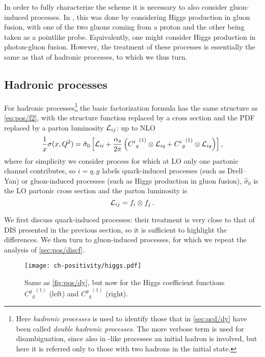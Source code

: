 In order to fully characterize the scheme it is necessary to also consider
gluon-induced processes. 
In \cite{Altarelli:1998gn}, this was done by considering Higgs production in
gluon fusion, with one of the two gluons coming from a proton and the other
being taken as a pointlike probe.
Equivalently, one might consider Higgs production in photon-gluon fusion.
However, the treatment of these processes is essentially the same as that of
hadronic processes, to which we thus turn.


\subsection{Hadronic processes}
\label{sec:pos/hadr}
For hadronic processes\footnote{
  Here \textit{hadronic processes} is used to identify those that in
  \cref{sec:qcd/dy} have been called \textit{double hadronic processes}.
  The more verbose term is used for disambiguation, since also in \dis-like
  processes an initial hadron is involved, but here it is referred only to
  those with two hadrons in the initial state.
} the basic factorization formula has the same structure
as \cref{eq:pos/f2}, with the structure function replaced by a cross section
and the PDF replaced by a parton luminosity ${\cal L}_{ij}$: up to NLO
\begin{equation}
 \frac{1}{x} \sigma(x,Q^2)= \hat \sigma_0 \left[  {\cal L}_{ii}
   +\frac{\alpha_s}{2\pi}\left( {{C^i}_q}^{(1)} \otimes {\cal L}_{iq} +
 {{C^i}_g}^{(1)} \otimes {\cal L}_{ig}\right) \right],\label{eq:pos/hadfact}
\end{equation}
where for simplicity we consider process for which at LO only one
partonic channel contributes, so
$i=q,g$ labels quark-induced processes (such as Drell--Yan) or
gluon-induced processes (such as Higgs production in gluon fusion),
$\hat{\sigma}_0$ is the LO partonic cross section and
the parton luminosity is 
\begin{equation}\label{eq:pos/lumi}
 {\cal L}_{ij}= f_i\otimes f_j\,.
\end{equation}

We first discuss quark-induced processes: their treatment is very close to that
of DIS  presented in the previous section, so it is sufficient to highlight the
differences.
We then turn to gluon-induced processes, for which we repeat the analysis of
\cref{sec:pos/discf}.


\begin{figure}[t]
  \begin{center}
    \texttt{[image: ch-positivity/higgs.pdf]}
    \caption{\small Same as \cref{fig:pos/dy}, but now for the Higgs
      coefficient functions  ${{{C^g}_g}^{(1)}}$ (left) and
      ${{{C^g}_q}^{(1)}}$ (right).
    \label{fig:pos/higgs} }
  \end{center}
\end{figure}



